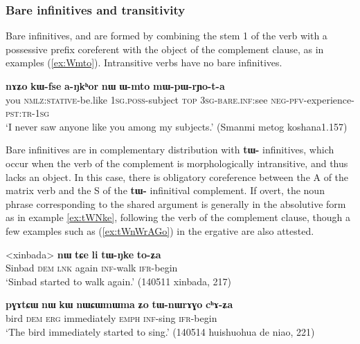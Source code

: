 \documentclass[oneside,a4paper,11pt]{article}
\newcommand{\ipa}[1]{\textbf{\phon#1}} %
\begin{document}
\subsubsection{Bare infinitives and transitivity}
Bare infinitives, and are formed by combining the stem 1 of the verb with a possessive prefix coreferent with the object of the complement clause, as in examples (\ref{ex:Wmto}). Intransitive verbs have no bare infinitives.

\begin{exe}
\ex \label{ex:Wmto}
\gll \ipa{nɤʑo} 	\ipa{kɯ-fse} 	\ipa{a-ŋkʰor} 	\ipa{nɯ} 	\ipa{ɯ-mto} 	\ipa{mɯ-pɯ-rɲo-t-a} \\
you \textsc{nmlz:stative}-be.like \textsc{1sg.poss}-subject \textsc{top} \textsc{3sg}-\textsc{bare.inf:}see \textsc{neg-pfv}-experience-\textsc{pst:tr-1sg} \\
\glt  `I never saw anyone like you among my subjects.' (Smanmi metog koshana1.157)
\end{exe} 

Bare infinitives are in complementary distribution with \ipa{tɯ-} infinitives,  which occur when the verb of the complement is morphologically intransitive, and thus lacks an object. In this case, there is obligatory coreference between the A of the matrix verb and the S of the \ipa{tɯ-} infinitival complement. If overt, the noun phrase corresponding to the shared argument is generally in the absolutive form as in example \ref{ex:tWNke}, following the verb of the complement clause, though a few examples such as (\ref{ex:tWnWrAGo}) in the ergative are also attested.

\begin{exe}
\ex \label{ex:tWNke}
\gll
<xinbada> 	\ipa{nɯ} 	\ipa{tɕe} 	\ipa{li} 	\ipa{tɯ-ŋke} 	\ipa{to-ʑa} \\
Sinbad \textsc{dem} \textsc{lnk} again  \textsc{inf}-walk \textsc{ifr}-begin \\
\glt `Sinbad started to walk again.' (140511 xinbada, 217)
\end{exe}


\begin{exe}
\ex \label{ex:tWnWrAGo}
\gll \ipa{pɣɤtɕɯ} 	\ipa{nɯ} 	\ipa{kɯ} 	\ipa{nɯɕɯmɯma} 	\ipa{ʑo} 	\ipa{tɯ-nɯrɤɣo} 	\ipa{cʰɤ-ʑa} \\
bird \textsc{dem} \textsc{erg} immediately \textsc{emph} \textsc{inf}-sing \textsc{ifr}-begin \\
\glt `The bird immediately started to sing.' (140514 huishuohua de niao, 221)
\end{exe}
\end{document}
